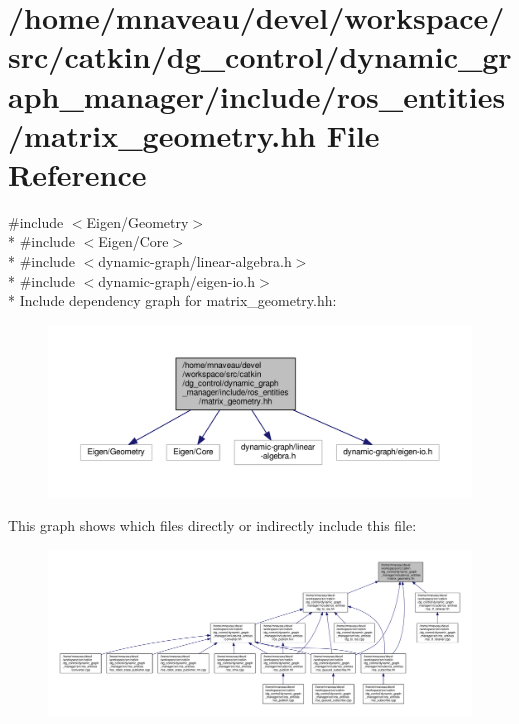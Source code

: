 \hypertarget{matrix__geometry_8hh}{}\section{/home/mnaveau/devel/workspace/src/catkin/dg\+\_\+control/dynamic\+\_\+graph\+\_\+manager/include/ros\+\_\+entities/matrix\+\_\+geometry.hh File Reference}
\label{matrix__geometry_8hh}
{\ttfamily \#include $<$Eigen/\+Geometry$>$}\\*
{\ttfamily \#include $<$Eigen/\+Core$>$}\\*
{\ttfamily \#include $<$dynamic-\/graph/linear-\/algebra.\+h$>$}\\*
{\ttfamily \#include $<$dynamic-\/graph/eigen-\/io.\+h$>$}\\*
Include dependency graph for matrix\+\_\+geometry.\+hh\+:\nopagebreak
\begin{figure}[H]
\begin{center}
\leavevmode
\includegraphics[width=350pt]{matrix__geometry_8hh__incl}
\end{center}
\end{figure}
This graph shows which files directly or indirectly include this file\+:\nopagebreak
\begin{figure}[H]
\begin{center}
\leavevmode
\includegraphics[width=350pt]{matrix__geometry_8hh__dep__incl}
\end{center}
\end{figure}

